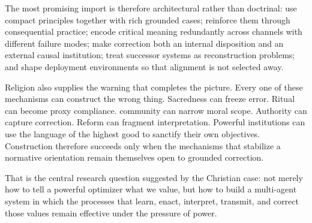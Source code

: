 \documentclass[11pt]{article}
\begin{document}
The most promising import is therefore architectural rather than doctrinal: use compact principles together with rich grounded cases; reinforce them through consequential practice; encode critical meaning redundantly across channels with different failure modes; make correction both an internal disposition and an external causal institution; treat successor systems as reconstruction problems; and shape deployment environments so that alignment is not selected away.

Religion also supplies the warning that completes the picture. Every one of these mechanisms can construct the wrong thing. Sacredness can freeze error. Ritual can become proxy compliance. community can narrow moral scope. Authority can capture correction. Reform can fragment interpretation. Powerful institutions can use the language of the highest good to sanctify their own objectives. Construction therefore succeeds only when the mechanisms that stabilize a normative orientation remain themselves open to grounded correction.

That is the central research question suggested by the Christian case: not merely how to tell a powerful optimizer what we value, but how to build a multi-agent system in which the processes that learn, enact, interpret, transmit, and correct those values remain effective under the pressure of power.

\printbibliography
\end{document}
